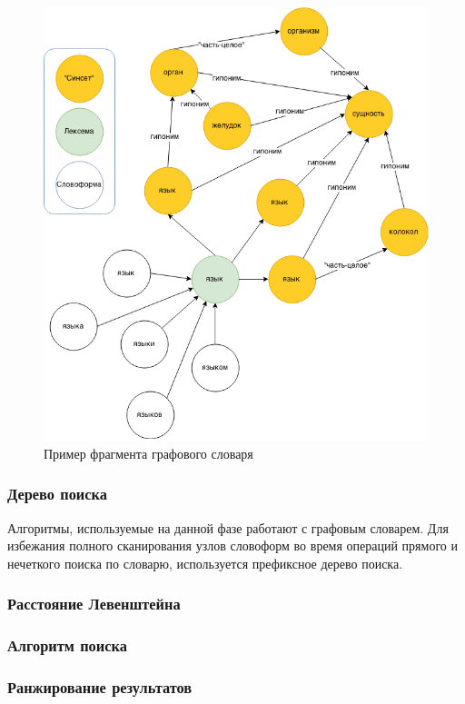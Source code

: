 \begin{figure}[H]
	\centering
	\includegraphics[scale=0.5]{img/dict.png}
	\caption{Пример фрагмента графового словаря}
\end{figure}

\subsubsection{Дерево поиска}
Алгоритмы, используемые на данной фазе работают с графовым словарем. Для избежания полного сканирования узлов словоформ во время операций прямого и нечеткого поиска по словарю, используется префиксное дерево поиска.

\subsubsection{Расстояние Левенштейна}
\subsubsection{Алгоритм поиска}
\subsubsection{Ранжирование результатов}